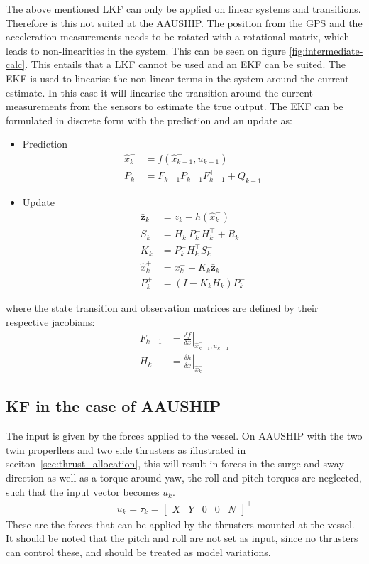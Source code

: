The above mentioned \ac{LKF} can only be applied on linear systems and transitions. Therefore is this not suited at the AAUSHIP. The position from the \ac{GPS} and the acceleration measurements needs to be rotated with a rotational matrix, which leads to non-linearities in the system. This can be seen on figure \vref{fig:intermediate-calc}. This entails that a \ac{LKF} cannot be used and an \ac{EKF} can be suited. The \ac{EKF} is used to linearise the non-linear terms in the system around the current estimate. In this case it will linearise the transition around the current measurements from the sensors to estimate the true output. The \ac{EKF} can be formulated in discrete form with the prediction and an update as:
\begin{itemize}\tightlist
\item Prediction
\begin{align}
\hat x_k^- &= f(\hat x_{k-1}^-,u_{k-1})\\
P_k^- &= F_{k-1}P_{k-1}^-F_{k-1}^\top+Q_{k-1}
\end{align}
\item Update
\begin{align}
\bar{\mathbf{z}}_k &= z_k - h(\hat x_k^-)\\
S_k &= H_k\ P_k^-H_k^\top + R_k\\
K_k &= P_k^-H_k^\top S_k^-\\
\hat x_k^+ &= x_k^- + K_k \bar{\mathbf{z}}_k\\
P_k^+ &= (I - K_k H_k) P_k^-
\end{align}
\end{itemize}
where the state transition and observation matrices are defined by their respective jacobians:
\begin{align}
F_{k-1} &= \left.\frac{\delta f}{\delta x}\right|_{\hat x_{k-1}^-,u_{k-1}}\\
H_k &= \left.\frac{\delta h}{\delta x}\right|_{\hat x_{k}^-}
\end{align}

\subsection{\acl{KF} in the case of AAUSHIP}
The input is given by the forces applied to the vessel. On AAUSHIP with the two twin properllers and two side thrusters as illustrated in seciton~\vref{sec:thrust_allocation}, this will result in forces in the surge and sway direction as well as a torque around yaw, the roll and pitch torques are neglected, such that the input vector becomes $u_k$.
\begin{align}
u_k = \tau_k =
\begin{bmatrix}
X & Y & 0 & 0 & N
\end{bmatrix}^\top
\end{align}
These are the forces that can be applied by the thrusters mounted at the vessel. It should be noted that the pitch and roll are not set as input, since no thrusters can control these, and should be treated as model variations.

